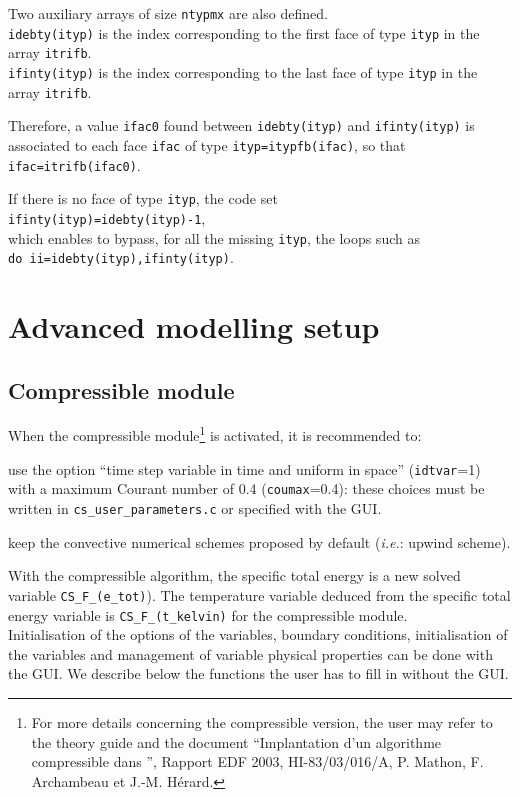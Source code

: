Two auxiliary arrays of size \texttt{ntypmx} are also defined.\\
\texttt{idebty(ityp)} is the index
corresponding to the first
face of type \texttt{ityp} in the array \texttt{itrifb}.\\
\texttt{ifinty(ityp)} is the index
corresponding to the last
face of type \texttt{ityp} in the array \texttt{itrifb}.

Therefore, a value \texttt{ifac0} found between \texttt{idebty(ityp)} and
\texttt{ifinty(ityp)} is associated to each face \texttt{ifac} of type
\texttt{ityp=itypfb(ifac)}, so that \texttt{ifac=itrifb(ifac0)}.

If there is no face of type \texttt{ityp}, the code set \\
\texttt{ifinty(ityp)=idebty(ityp)-1},\\
which enables to bypass, for all the missing \texttt{ityp}, the loops such as \\
\texttt{do ii=idebty(ityp),ifinty(ityp)}.


\section{Advanced modelling setup}

\subsection{Compressible module}

When the compressible module\footnote{For more details concerning the
compressible version, the user may refer to the theory guide \cite{theory} and the document ``Implantation
d'un algorithme compressible dans \CS'', Rapport EDF 2003,
HI-83/03/016/A, P. Mathon, F. Archambeau et J.-M. H\'erard.} is
activated, it is recommended to:
\begin{list}{-}{}
 \item use the option ``time step variable in time and uniform in
       space'' (\texttt{idtvar}=1) with a maximum Courant number of 0.4
       (\texttt{coumax}=0.4): these choices must be written in \texttt{cs\_user\_parameters.c}
       or specified with the GUI.
 \item keep the convective numerical schemes proposed by default (\textit{i.e.}: upwind scheme).
\end{list}
With the compressible algorithm, the specific total energy is a new solved variable
\texttt{CS\_F\_(e\_tot)}). The temperature variable deduced from the specific
total energy variable is \texttt{CS\_F\_(t\_kelvin)} for the compressible module.\\
Initialisation of the options of the variables, boundary conditions, initialisation of the variables and
management of variable physical properties can be done with the GUI. We describe below the functions
the user has to fill in without the GUI.


